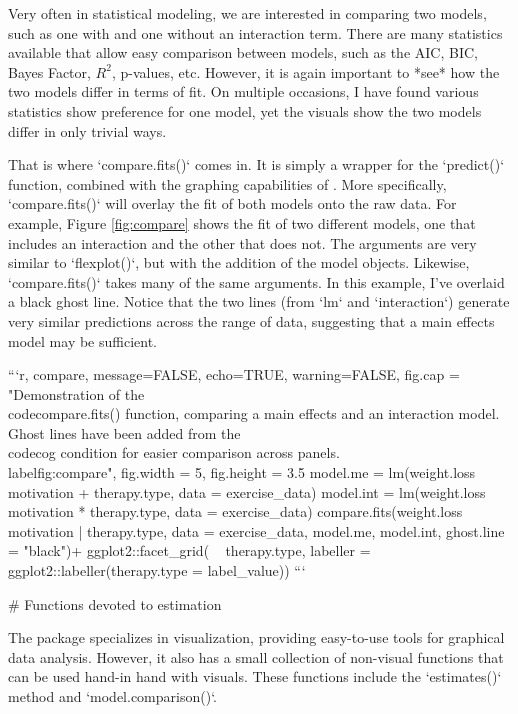 {{{{{{{{{{{{{Very often in statistical modeling, we are interested in comparing two models, such as one with and one without an interaction term. There are many statistics available that allow easy comparison between models, such as the AIC, BIC, Bayes Factor, $R^2$, p-values, etc. However, it is again important to *see* how the two models differ in terms of fit. On multiple occasions, I have found various statistics show preference for one model, yet the visuals show the two models differ in only trivial ways. 

That is where `compare.fits()` comes in. It is simply a wrapper for the `predict()` function, combined with the graphing capabilities of . More specifically, `compare.fits()` will overlay the fit of both models onto the raw data. For example, Figure \ref{fig:compare} shows the fit of two different models, one that includes an interaction and the other that does not. The arguments are very similar to `flexplot()`, but with the addition of the model objects. Likewise, `compare.fits()` takes many of the same arguments. In this example, I've overlaid a black ghost line. Notice that the two lines (from `lm` and `interaction`) generate very similar predictions across the range of data, suggesting that a main effects model may be sufficient. 

```{r, compare, message=FALSE, echo=TRUE, warning=FALSE, fig.cap = "Demonstration of the \\code{compare.fits()} function, comparing a main effects and an interaction model. Ghost lines have been added from the \\code{cog} condition for easier comparison across panels. \\label{fig:compare}", fig.width = 5, fig.height = 3.5}
model.me = lm(weight.loss ~ motivation + therapy.type, data = exercise_data)
model.int = lm(weight.loss ~ motivation * therapy.type, data = exercise_data)
compare.fits(weight.loss ~ motivation | therapy.type, 
             data = exercise_data, model.me, model.int, ghost.line = "black")+
      ggplot2::facet_grid( ~ therapy.type, 
          labeller = ggplot2::labeller(therapy.type = label_value))
```

# Functions devoted to estimation

The  package specializes in visualization, providing easy-to-use tools for graphical data analysis. However, it also has a small collection of non-visual functions that can be used hand-in hand with visuals. These functions include the `estimates()` method and `model.comparison()`. 

}}}}}}}}}}}}}
